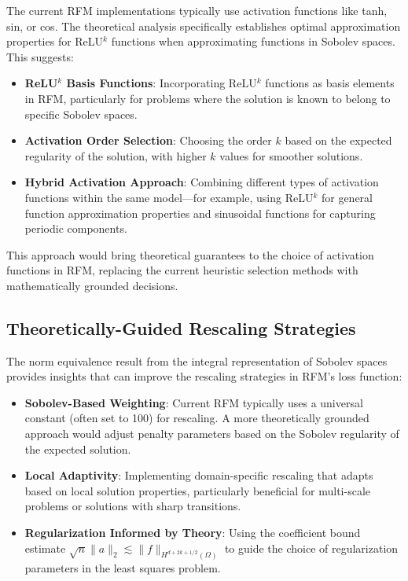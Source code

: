 \documentclass[11pt]{article}
\begin{document}
The current RFM implementations typically use activation functions like tanh, sin, or cos. The theoretical analysis specifically establishes optimal approximation properties for ReLU$^k$ functions when approximating functions in Sobolev spaces. This suggests:

\begin{itemize}
    \item \textbf{ReLU$^k$ Basis Functions}: Incorporating ReLU$^k$ functions as basis elements in RFM, particularly for problems where the solution is known to belong to specific Sobolev spaces.
    
    \item \textbf{Activation Order Selection}: Choosing the order $k$ based on the expected regularity of the solution, with higher $k$ values for smoother solutions.
    
    \item \textbf{Hybrid Activation Approach}: Combining different types of activation functions within the same model—for example, using ReLU$^k$ for general function approximation properties and sinusoidal functions for capturing periodic components.
\end{itemize}

This approach would bring theoretical guarantees to the choice of activation functions in RFM, replacing the current heuristic selection methods with mathematically grounded decisions.

\subsection{Theoretically-Guided Rescaling Strategies}

The norm equivalence result from the integral representation of Sobolev spaces provides insights that can improve the rescaling strategies in RFM's loss function:

\begin{itemize}
    \item \textbf{Sobolev-Based Weighting}: Current RFM typically uses a universal constant (often set to 100) for rescaling. A more theoretically grounded approach would adjust penalty parameters based on the Sobolev regularity of the expected solution.
    
    \item \textbf{Local Adaptivity}: Implementing domain-specific rescaling that adapts based on local solution properties, particularly beneficial for multi-scale problems or solutions with sharp transitions.
    
    \item \textbf{Regularization Informed by Theory}: Using the coefficient bound estimate $\sqrt{n}\|a\|_2 \lesssim \|f\|_{H^{d+2k+1/2}(\Omega)}$ to guide the choice of regularization parameters in the least squares problem.
\end{itemize}
\end{document}
